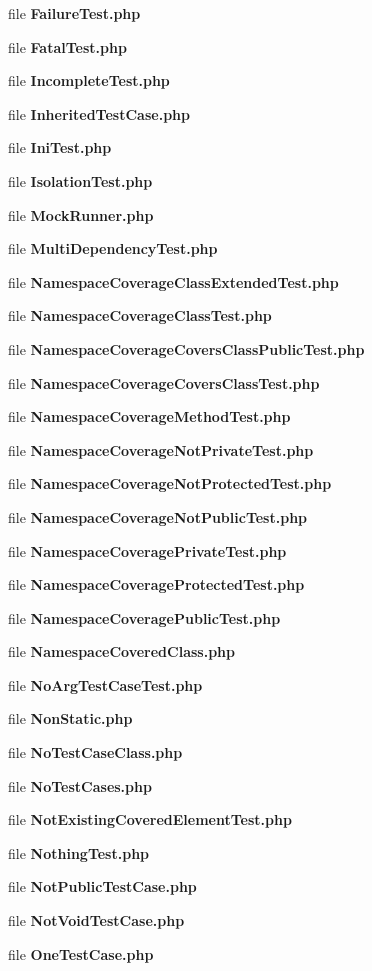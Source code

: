 \begin{DoxyCompactItemize}
file {\bf Failure\+Test.\+php}
\item 
file {\bf Fatal\+Test.\+php}
\item 
file {\bf Incomplete\+Test.\+php}
\item 
file {\bf Inherited\+Test\+Case.\+php}
\item 
file {\bf Ini\+Test.\+php}
\item 
file {\bf Isolation\+Test.\+php}
\item 
file {\bf Mock\+Runner.\+php}
\item 
file {\bf Multi\+Dependency\+Test.\+php}
\item 
file {\bf Namespace\+Coverage\+Class\+Extended\+Test.\+php}
\item 
file {\bf Namespace\+Coverage\+Class\+Test.\+php}
\item 
file {\bf Namespace\+Coverage\+Covers\+Class\+Public\+Test.\+php}
\item 
file {\bf Namespace\+Coverage\+Covers\+Class\+Test.\+php}
\item 
file {\bf Namespace\+Coverage\+Method\+Test.\+php}
\item 
file {\bf Namespace\+Coverage\+Not\+Private\+Test.\+php}
\item 
file {\bf Namespace\+Coverage\+Not\+Protected\+Test.\+php}
\item 
file {\bf Namespace\+Coverage\+Not\+Public\+Test.\+php}
\item 
file {\bf Namespace\+Coverage\+Private\+Test.\+php}
\item 
file {\bf Namespace\+Coverage\+Protected\+Test.\+php}
\item 
file {\bf Namespace\+Coverage\+Public\+Test.\+php}
\item 
file {\bf Namespace\+Covered\+Class.\+php}
\item 
file {\bf No\+Arg\+Test\+Case\+Test.\+php}
\item 
file {\bf Non\+Static.\+php}
\item 
file {\bf No\+Test\+Case\+Class.\+php}
\item 
file {\bf No\+Test\+Cases.\+php}
\item 
file {\bf Not\+Existing\+Covered\+Element\+Test.\+php}
\item 
file {\bf Nothing\+Test.\+php}
\item 
file {\bf Not\+Public\+Test\+Case.\+php}
\item 
file {\bf Not\+Void\+Test\+Case.\+php}
\item 
file {\bf One\+Test\+Case.\+php}
\item 

\end{DoxyCompactItemize}
